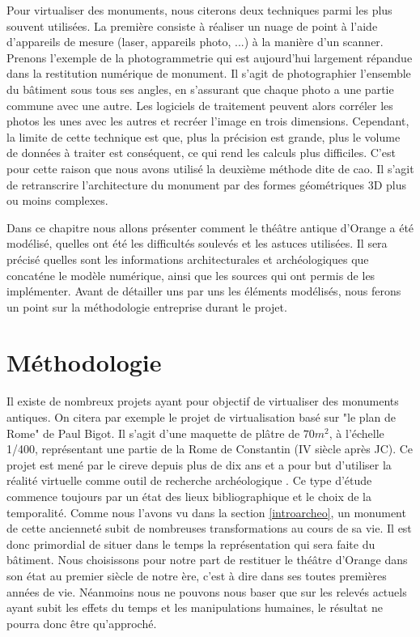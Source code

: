 Pour virtualiser des monuments, nous citerons deux techniques parmi les plus souvent utilisées. La première consiste à réaliser un nuage de point à l'aide d'appareils de mesure (laser, appareils photo, ...) à la manière d'un scanner. Prenons l'exemple de la photogrammetrie qui est aujourd'hui largement répandue dans la restitution numérique de monument. Il s'agit de photographier l'ensemble du bâtiment sous tous ses angles, en s'assurant que chaque photo a une partie commune avec une autre. Les logiciels de traitement peuvent alors corréler les photos les unes avec les autres et recréer l'image en trois dimensions. Cependant, la limite de cette technique est que, plus la précision est grande, plus le volume de données à traiter est conséquent, ce qui rend les calculs plus difficiles. C'est pour cette raison que nous avons utilisé la deuxième méthode dite de \gls{cao}. Il s'agit de retranscrire l'architecture du monument par des formes géométriques 3D plus ou moins complexes.

Dans ce chapitre nous allons présenter comment le théâtre antique d'Orange a été modélisé, quelles ont été les difficultés soulevés et les astuces utilisées. Il sera précisé quelles sont les informations architecturales et archéologiques que concaténe le modèle numérique, ainsi que les sources qui ont permis de les implémenter.
Avant de détailler uns par uns les éléments modélisés, nous ferons un point sur la méthodologie entreprise durant le projet.


\section{Méthodologie}

Il existe de nombreux projets ayant pour objectif de virtualiser des monuments antiques. On citera par exemple le projet de virtualisation basé sur "le plan de Rome" de Paul Bigot. Il s'agit d'une maquette de plâtre de $70m^2$, à l'échelle 1/400, représentant une partie de la Rome de Constantin (IV siècle après JC). Ce projet est mené par le \gls{cireve} depuis plus de dix ans et a pour but d'utiliser la réalité virtuelle comme outil de recherche archéologique \cite[p. 157-158]{fleury}. Ce type d'étude commence toujours par un état des lieux bibliographique et le choix de la temporalité. Comme nous l'avons vu dans la section \ref{introarcheo}, un monument de cette ancienneté subit de nombreuses transformations au cours de sa vie. Il est donc primordial de situer dans le temps la représentation qui sera faite du bâtiment. Nous choisissons pour notre part de restituer le théâtre d'Orange dans son état au premier siècle de notre ère, c'est à dire dans ses toutes premières années de vie. Néanmoins nous ne pouvons nous baser que sur les relevés actuels ayant subit les effets du temps et les manipulations humaines, le résultat ne pourra donc être qu'approché.


